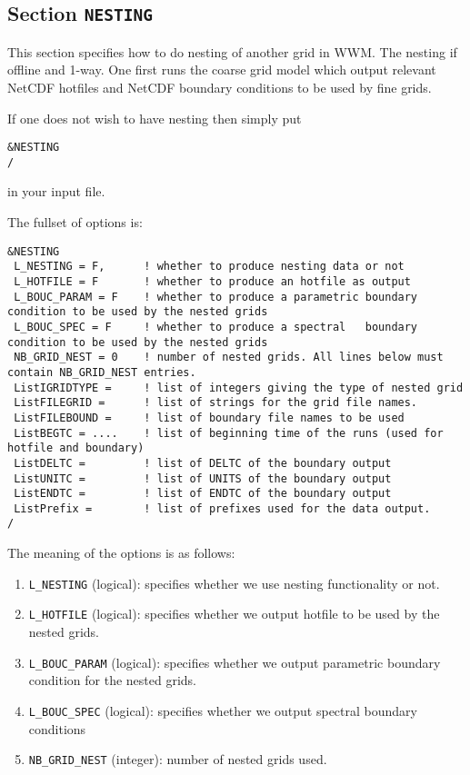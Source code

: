 \documentclass[12pt]{amsart}
\begin{document}
\subsection{Section {\tt NESTING}}
This section specifies how to do nesting of another grid in WWM. The nesting if offline and 1-way.
One first runs the coarse grid model which output relevant NetCDF hotfiles and NetCDF boundary conditions to be
used by fine grids.

If one does not wish to have nesting then simply put
\begin{verbatim}
&NESTING
/
\end{verbatim}
in your input file.

The fullset of options is:
\begin{verbatim}
&NESTING
 L_NESTING = F,      ! whether to produce nesting data or not
 L_HOTFILE = F       ! whether to produce an hotfile as output
 L_BOUC_PARAM = F    ! whether to produce a parametric boundary condition to be used by the nested grids
 L_BOUC_SPEC = F     ! whether to produce a spectral   boundary condition to be used by the nested grids
 NB_GRID_NEST = 0    ! number of nested grids. All lines below must contain NB_GRID_NEST entries.
 ListIGRIDTYPE =     ! list of integers giving the type of nested grid
 ListFILEGRID =      ! list of strings for the grid file names.
 ListFILEBOUND =     ! list of boundary file names to be used
 ListBEGTC = ....    ! list of beginning time of the runs (used for hotfile and boundary)
 ListDELTC =         ! list of DELTC of the boundary output
 ListUNITC =         ! list of UNITS of the boundary output
 ListENDTC =         ! list of ENDTC of the boundary output
 ListPrefix =        ! list of prefixes used for the data output.
/
\end{verbatim}
The meaning of the options is as follows:
\begin{enumerate}
\item {\tt L\_NESTING} (logical): specifies whether we use nesting functionality or not.
\item {\tt L\_HOTFILE} (logical): specifies whether we output hotfile to be used by the nested grids.
\item {\tt L\_BOUC\_PARAM} (logical): specifies whether we output parametric boundary condition for the nested grids.
\item {\tt L\_BOUC\_SPEC} (logical): specifies whether we output spectral boundary conditions
\item {\tt NB\_GRID\_NEST} (integer): number of nested grids used.
\end{enumerate}
\end{document}
